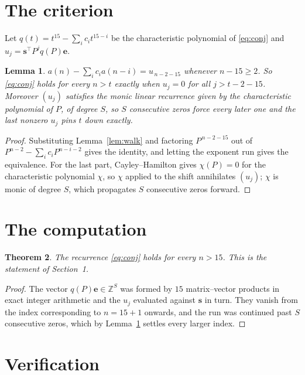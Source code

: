 \documentclass[11pt,a4paper]{article}
\theoremstyle{plain}
\newtheorem{theorem}{Theorem}
\newtheorem{lemma}[theorem]{Lemma}
\theoremstyle{definition}
\begin{document}
\section{The criterion}

Let $q(t)=t^{15}-\sum_i c_i t^{15-i}$ be the characteristic polynomial of
\eqref{eq:conj} and $u_j=\mathbf{s}^{\!\top}P^{j}q(P)\mathbf{e}$.

\begin{lemma}\label{lem:crit}
$a(n)-\sum_i c_i a(n-i)=u_{\,n-2-15}$ whenever $n-15\ge2$. So \eqref{eq:conj}
holds for every $n>t$ exactly when $u_j=0$ for all $j>t-2-15$. Moreover $(u_j)$
satisfies the monic linear recurrence given by the characteristic polynomial of $P$, of
degree $S$, so $S$ consecutive zeros force every later one and the last nonzero $u_j$ pins
$t$ down exactly.
\end{lemma}

\begin{proof}
Substituting Lemma~\ref{lem:walk} and factoring $P^{\,n-2-15}$ out of
$P^{n-2}-\sum_i c_i P^{n-i-2}$ gives the identity, and letting the exponent run gives the
equivalence. For the last part, Cayley--Hamilton gives $\chi(P)=0$ for the characteristic
polynomial $\chi$, so $\chi$ applied to the shift annihilates $(u_j)$; $\chi$ is monic of
degree $S$, which propagates $S$ consecutive zeros forward.
\end{proof}

\section{The computation}

\begin{theorem}
The recurrence \eqref{eq:conj} holds for every $n>15$. This is the statement of
Section~1.
\end{theorem}

\begin{proof}
The vector $q(P)\mathbf{e}\in\mathbb{Z}^{S}$ was formed by $15$ matrix--vector
products in exact integer arithmetic and the $u_j$ evaluated against $\mathbf{s}$ in turn.
They vanish from the index corresponding to $n=15+1$ onwards, and the run was continued
past $S$ consecutive zeros, which by Lemma~\ref{lem:crit} settles every larger index.
\end{proof}

\section{Verification}
\end{document}
